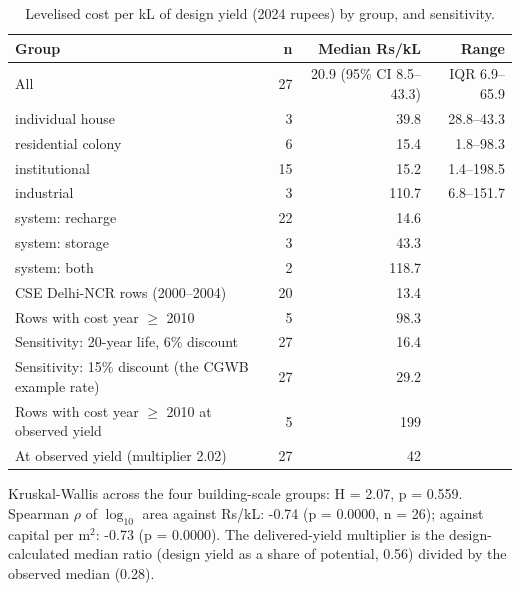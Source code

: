 
\begin{table}[H]\centering\small
\caption{Levelised cost per kL of design yield (2024 rupees) by group, and sensitivity.}\label{tab:coststats}
\begin{tabular}{lrrr}\toprule
Group & n & Median Rs/kL & Range\\ \midrule
All & 27 & 20.9 (95\% CI 8.5--43.3) & IQR 6.9--65.9\\
individual house & 3 & 39.8 & 28.8--43.3\\
residential colony & 6 & 15.4 & 1.8--98.3\\
institutional & 15 & 15.2 & 1.4--198.5\\
industrial & 3 & 110.7 & 6.8--151.7\\
system: recharge & 22 & 14.6 & \\
system: storage & 3 & 43.3 & \\
system: both & 2 & 118.7 & \\
CSE Delhi-NCR rows (2000--2004) & 20 & 13.4 &\\
Rows with cost year $\geq$ 2010 & 5 & 98.3 &\\
Sensitivity: 20-year life, 6\% discount & 27 & 16.4 &\\
Sensitivity: 15\% discount (the CGWB example rate) & 27 & 29.2 &\\
Rows with cost year $\geq$ 2010 at observed yield & 5 & 199 &\\
At observed yield (multiplier 2.02) & 27 & 42 &\\
\bottomrule\end{tabular}
\end{table}
Kruskal-Wallis across the four building-scale groups: H = 2.07, p = 0.559. Spearman $\rho$ of $\log_{10}$ area against Rs/kL: -0.74 (p = 0.0000, n = 26); against capital per m$^2$: -0.73 (p = 0.0000). The delivered-yield multiplier is the design-calculated median ratio (design yield as a share of potential, 0.56) divided by the observed median (0.28).
